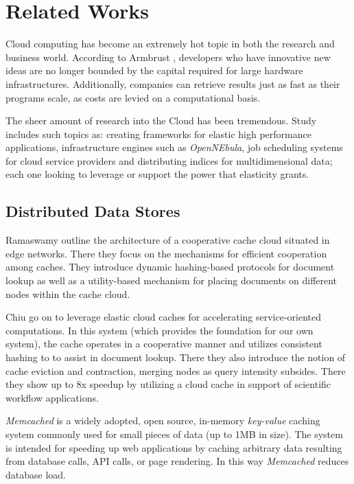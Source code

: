 \section{Related Works}
Cloud computing has become an extremely hot topic in both the research and
business world. According to Armbrust \etal, developers who have innovative new
ideas are no longer bounded by the capital required for large hardware
infrastructures\cite{cloud1}. Additionally, companies can retrieve results just
as fast as their programs scale, as costs are levied on a computational basis.

The sheer amount of research into the Cloud has been tremendous. Study includes
such topics as: creating frameworks for elastic high performance
applications\cite{cloud5}, infrastructure engines such as
\emph{OpenNEbula}\cite{cloud2}, job scheduling systems for cloud service
providers\cite{cloud3} and distributing indices for multidimensional
data\cite{cloud4}; each one looking to leverage or support the power that
elasticity grants.

\subsection{Distributed Data Stores}
Ramaswamy \etal outline the architecture of a cooperative cache cloud situated
in edge networks\cite{cloud6}. There they focus on the mechanisms for efficient
cooperation among caches. They introduce dynamic hashing-based protocols for
document lookup as well as a utility-based mechanism for placing documents on
different nodes within the cache cloud.

Chiu \etal go on to leverage elastic cloud caches for accelerating
service-oriented computations. In this system (which provides the foundation
for our own system), the cache operates in a cooperative manner and utilizes
consistent hashing to to assist in document lookup. There they also introduce
the notion of cache eviction and contraction, merging nodes as query
intensity subsides. There they show up to 8x speedup by utilizing a cloud cache
in support of scientific workflow applications.

\emph{Memcached}\cite{memcached,memcachedb} is a widely adopted, open source,
in-memory \emph{key-value} caching system commonly used for small pieces of
data (up to 1MB in size). The system is intended for speeding up web
applications by caching arbitrary data resulting from database calls, API
calls, or page rendering. In this way \emph{Memcached} reduces database
load.

